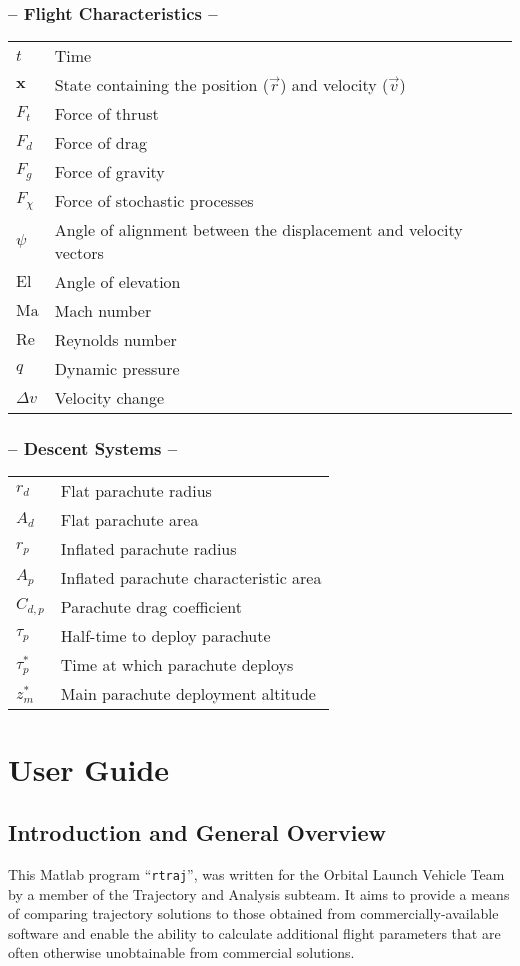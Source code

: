 \documentclass[11pt]{thesis}
\numberwithin{equation}{section}
\begin{document}
\subsection*{-- Flight Characteristics --}
\begin{longtable}[l]{l l}
$t$ & Time \\
$\mathbf{x}$ & State containing the position ($\vec{r}$) and velocity ($\vec{v}$) \\
$F_t$ & Force of thrust \\
$F_d$ & Force of drag \\
$F_g$ & Force of gravity \\
$F_\chi$ & Force of stochastic processes \\
$\psi$ & Angle of alignment between the displacement and velocity vectors \\
$\mathrm{El}$ & Angle of elevation \\
$\mathrm{Ma}$ & Mach number \\
$\mathrm{Re}$ & Reynolds number \\
$q$ & Dynamic pressure \\
$\Delta v$ & Velocity change
\end{longtable}
\subsection*{-- Descent Systems --}
\begin{longtable}[l]{l l}
$r_d$ & Flat parachute radius \\
$A_d$ & Flat parachute area \\
$r_p$ & Inflated parachute radius \\
$A_p$ & Inflated parachute characteristic area \\
$C_{d,p}$ & Parachute drag coefficient \\
$\tau_p$ & Half-time to deploy parachute \\
$\tau_p^*$ & Time at which parachute deploys \\
$z_m^*$ & Main parachute deployment altitude
\end{longtable}

\chapter{User Guide}
\thispagestyle{fancy}
\newpage
\section{Introduction and General Overview}
This Matlab program ``\texttt{rtraj}'', was written for the Orbital Launch Vehicle Team by a member of the Trajectory and Analysis subteam. It aims to provide a means of comparing trajectory solutions to those obtained from commercially-available software and enable the ability to calculate additional flight parameters that are often otherwise unobtainable from commercial solutions.
\end{document}
